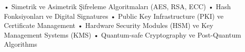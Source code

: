 • Simetrik ve Asimetrik Şifreleme Algoritmaları (AES, RSA, ECC)
• Hash Fonksiyonları ve Digital Signatures
• Public Key Infrastructure (PKI) ve Certificate Management
• Hardware Security Modules (HSM) ve Key Management Systems (KMS)
• Quantum-safe Cryptography ve Post-Quantum Algorithms